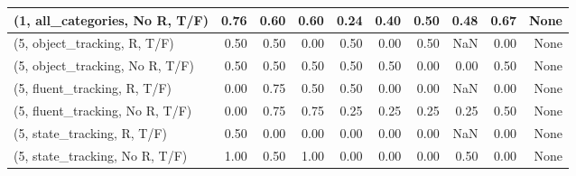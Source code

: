 \begin{table*}[h!]
\begin{adjustbox}{width=2\columnwidth,center}
\begin{tabular}{lrrr|rrr|rrr}
(1, all\_categories, No R, T/F)       &                      0.76 &                  0.60 &                      0.60 &                          0.24 &                      0.40 &                          0.50 &                                   0.48 &                               0.67 &                                  None \\



\midrule
(5, object\_tracking, R, T/F)         &                      0.50 &                  0.50 &                      0.00 &                          0.50 &                      0.00 &                          0.50 &                                    NaN &                               0.00 &                                  None \\
(5, object\_tracking, No R, T/F)      &                      0.50 &                  0.50 &                      0.50 &                          0.50 &                      0.50 &                          0.00 &                                   0.00 &                               0.50 &                                  None \\
(5, fluent\_tracking, R, T/F)         &                      0.00 &                  0.75 &                      0.50 &                          0.50 &                      0.00 &                          0.00 &                                    NaN &                               0.00 &                                  None \\
(5, fluent\_tracking, No R, T/F)      &                      0.00 &                  0.75 &                      0.75 &                          0.25 &                      0.25 &                          0.25 &                                   0.25 &                               0.50 &                                  None \\
(5, state\_tracking, R, T/F)          &                      0.50 &                  0.00 &                      0.00 &                          0.00 &                      0.00 &                          0.00 &                                    NaN &                               0.00 &                                  None \\
(5, state\_tracking, No R, T/F)       &                      1.00 &                  0.50 &                      1.00 &                          0.00 &                      0.00 &                          0.00 &                                   0.50 &                               0.00 &                                  None \\

\end{tabular}
\end{adjustbox}
\end{table*}
